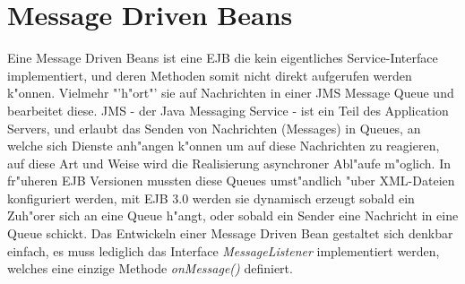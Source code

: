 \section{Message Driven Beans}
\label{sec:chap2:mdb}

Eine Message Driven Beans ist eine EJB die kein eigentliches Service-Interface implementiert,
und deren Methoden somit nicht direkt aufgerufen werden k"onnen. Vielmehr "'h"ort"' sie auf
Nachrichten in einer JMS Message Queue und bearbeitet diese.  JMS - der Java Messaging Service - 
ist ein Teil des Application Servers, und erlaubt das Senden von Nachrichten (Messages) in
Queues, an welche sich Dienste anh"angen k"onnen um auf diese Nachrichten zu reagieren,
auf diese Art und Weise wird die Realisierung asynchroner Abl"aufe m"oglich.
In fr"uheren EJB Versionen mussten diese Queues umst"andlich "uber XML-Dateien konfiguriert werden,
mit EJB 3.0 werden sie dynamisch erzeugt sobald ein Zuh"orer sich an eine Queue h"angt, oder
sobald ein Sender eine Nachricht in eine Queue schickt. Das Entwickeln einer Message Driven Bean 
gestaltet sich denkbar einfach, es muss lediglich das Interface \emph{MessageListener} implementiert
werden, welches eine einzige Methode \emph{onMessage()} definiert.


